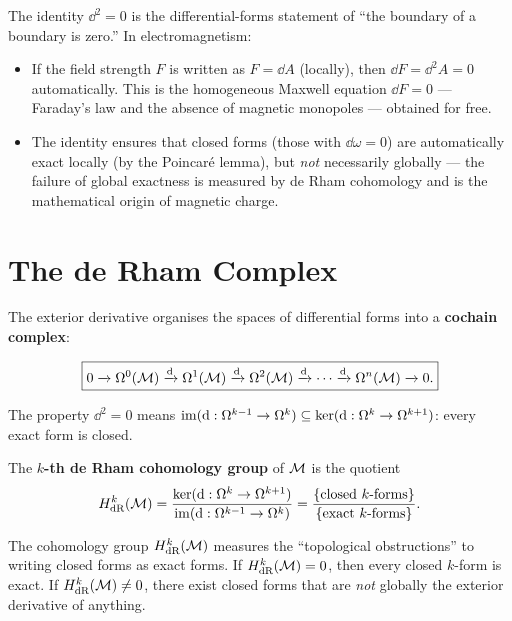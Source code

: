\begin{remark}
The identity $\dd^2 = 0$ is the differential-forms statement of ``the boundary of a boundary is zero.'' In electromagnetism:
\begin{itemize}
\item If the field strength $F$ is written as $F = \dd A$ (locally), then $\dd F = \dd^2 A = 0$ automatically. This is the homogeneous Maxwell equation $\dd F = 0$ --- Faraday's law and the absence of magnetic monopoles --- obtained for free.
\item The identity ensures that closed forms (those with $\dd\omega = 0$) are automatically exact locally (by the Poincar\'e lemma), but \emph{not} necessarily globally --- the failure of global exactness is measured by de Rham cohomology and is the mathematical origin of magnetic charge.
\end{itemize}
\end{remark}

\section{The de Rham Complex}

The exterior derivative organises the spaces of differential forms into a \textbf{cochain complex}:

\begin{equation}
\boxed{0 \xrightarrow{} \Omega^0(\mathcal{M}) \xrightarrow{\mathrm{d}} \Omega^1(\mathcal{M}) \xrightarrow{\mathrm{d}} \Omega^2(\mathcal{M}) \xrightarrow{\mathrm{d}} \cdots \xrightarrow{\mathrm{d}} \Omega^n(\mathcal{M}) \xrightarrow{} 0.}
\end{equation}

The property $\dd^2 = 0$ means $\operatorname{im}(\mathrm{d}: \Omega^{k-1} \to \Omega^k) \subseteq \ker(\mathrm{d}: \Omega^k \to \Omega^{k+1})$: every exact form is closed.

\begin{definition}
The \textbf{$k$-th de Rham cohomology group} of $\mathcal{M}$ is the quotient
\begin{equation}
H^k_{\text{dR}}(\mathcal{M}) = \frac{\ker(\mathrm{d}: \Omega^k \to \Omega^{k+1})}{\operatorname{im}(\mathrm{d}: \Omega^{k-1} \to \Omega^k)} = \frac{\{\text{closed $k$-forms}\}}{\{\text{exact $k$-forms}\}}.
\end{equation}
\end{definition}

The cohomology group $H^k_{\text{dR}}(\mathcal{M})$ measures the ``topological obstructions'' to writing closed forms as exact forms. If $H^k_{\text{dR}}(\mathcal{M}) = 0$, then every closed $k$-form is exact. If $H^k_{\text{dR}}(\mathcal{M}) \neq 0$, there exist closed forms that are \emph{not} globally the exterior derivative of anything.

